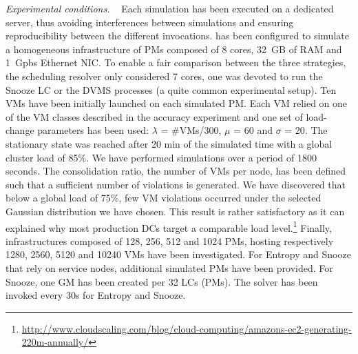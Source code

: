 \emph{Experimental conditions. ~} 
Each simulation has been executed on a dedicated server, thus
avoiding interferences between simulations and ensuring
reproducibility between the different invocations.
%
\vmps has been configured to simulate a homogeneous infrastructure of
PMs composed of 8 cores, 32~GB of RAM and 1~Gpbs Ethernet NIC. To
enable a fair comparison between the three strategies, the scheduling
resolver only considered 7 cores, \ie one was devoted to run the
Snooze LC or the DVMS processes (a quite common experimental setup).
Ten VMs have been initially launched on each simulated PM. Each VM
relied on one of the VM classes described in the accuracy experiment
and one set of load-change parameters has been used: $\lambda$ = 
\#VMs/300, $\mu$ = 60 and $\sigma$ = 20. The stationary state was
reached after 20 min of the simulated time with a global cluster load
of 85\%.
We have performed simulations over a period of 1800 seconds. The
consolidation ratio, \ie the number of VMs per node, has been defined
such that a sufficient number of violations is generated. We have
discovered that below a global load of 75\%, few VM violations occurred
under the selected Gaussian distribution we have chosen. This result
is rather satisfactory as it can explained why most production DCs
target a comparable load
level.\footnote{\url{http://www.cloudscaling.com/blog/cloud-computing/amazons-ec2-generating-220m-annually/}}
Finally, infrastructures composed of 128, 256, 512 and 1024 PMs,
hosting respectively 1280, 2560, 5120 and 10240 VMs have been
investigated. For Entropy and Snooze that rely on service nodes,
additional simulated PMs have been provided. For Snooze, one GM has
been created per 32 LCs (\ie PMs). The solver has been invoked
every 30s for Entropy and Snooze.
